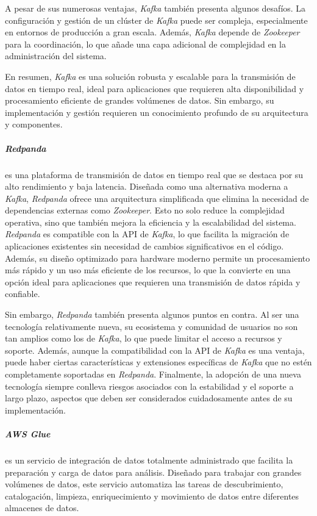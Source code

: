 A pesar de sus numerosas ventajas, \textit{Kafka} también presenta algunos
desafíos. La configuración y gestión de un clúster de \textit{Kafka} puede ser
compleja, especialmente en entornos de producción a gran escala. Además,
\textit{Kafka} depende de \textit{Zookeeper} para la coordinación, lo que añade
una capa adicional de complejidad en la administración del sistema.

En resumen, \textit{Kafka} es una solución robusta y escalable para la
transmisión de datos en tiempo real, ideal para aplicaciones que requieren alta
disponibilidad y procesamiento eficiente de grandes volúmenes de datos. Sin
embargo, su implementación y gestión requieren un conocimiento profundo de su
arquitectura y componentes.

\newpage{}
\subparagraph{Redpanda} es una plataforma de transmisión de datos en tiempo real
que se destaca por su alto rendimiento y baja latencia. Diseñada como una
alternativa moderna a \textit{Kafka}, \textit{Redpanda} ofrece una arquitectura
simplificada que elimina la necesidad de dependencias externas como
\textit{Zookeeper}. Esto no solo reduce la complejidad operativa, sino que
también mejora la eficiencia y la escalabilidad del sistema. \textit{Redpanda}
es compatible con la API de \textit{Kafka}, lo que facilita la migración de
aplicaciones existentes sin necesidad de cambios significativos en el código.
Además, su diseño optimizado para hardware moderno permite un procesamiento más
rápido y un uso más eficiente de los recursos, lo que la convierte en una opción
ideal para aplicaciones que requieren una transmisión de datos rápida y
confiable.

Sin embargo, \textit{Redpanda} también presenta algunos puntos en contra. Al ser
una tecnología relativamente nueva, su ecosistema y comunidad de usuarios no son
tan amplios como los de \textit{Kafka}, lo que puede limitar el acceso a
recursos y soporte. Además, aunque la compatibilidad con la API de
\textit{Kafka} es una ventaja, puede haber ciertas características y extensiones
específicas de \textit{Kafka} que no estén completamente soportadas en
\textit{Redpanda}. Finalmente, la adopción de una nueva tecnología siempre
conlleva riesgos asociados con la estabilidad y el soporte a largo plazo,
aspectos que deben ser considerados cuidadosamente antes de su implementación.

\subparagraph{AWS Glue} es un servicio de integración de datos totalmente
administrado que facilita la preparación y carga de datos para análisis.
Diseñado para trabajar con grandes volúmenes de datos, este servicio
automatiza las tareas de descubrimiento, catalogación, limpieza, enriquecimiento
y movimiento de datos entre diferentes almacenes de datos.

